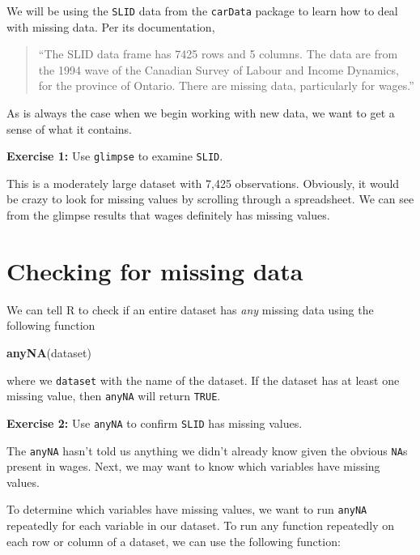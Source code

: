 \documentclass[
]{book}
\newenvironment{Shaded}{\begin{snugshade}}{\end{snugshade}}
\newcommand{\KeywordTok}[1]{\textcolor[rgb]{0.13,0.29,0.53}{\textbf{#1}}}
\newcommand{\NormalTok}[1]{#1}
\newenvironment{learncheck}%
{%
  \par\vspace{\baselineskip}\noindent 
  \color{Exercise}\begin{itshape}%
  \par\vspace{\baselineskip}\noindent\ignorespaces 
}%
{%
  \end{itshape}\ignorespacesafterend 
}
\begin{document}
We will be using the \texttt{SLID} data from the \texttt{carData} package to learn how to deal with missing data. Per its documentation,

\begin{quote}
``The SLID data frame has 7425 rows and 5 columns. The data are from the 1994 wave of the Canadian Survey of Labour and Income Dynamics, for the province of Ontario. There are missing data, particularly for wages.''
\end{quote}

As is always the case when we begin working with new data, we want to get a sense of what it contains.

\begin{learncheck}
\textbf{Exercise 1:} Use \texttt{glimpse} to examine \texttt{SLID}.
\end{learncheck}

This is a moderately large dataset with 7,425 observations. Obviously, it would be crazy to look for missing values by scrolling through a spreadsheet. We can see from the glimpse results that wages definitely has missing values.

\hypertarget{checking-for-missing-data}{%
\section{Checking for missing data}\label{checking-for-missing-data}}

We can tell R to check if an entire dataset has \emph{any} missing data using the following function

\begin{Shaded}
\begin{Highlighting}[]
\KeywordTok{anyNA}\NormalTok{(dataset)}
\end{Highlighting}
\end{Shaded}

where we \texttt{dataset} with the name of the dataset. If the dataset has at least one missing value, then \texttt{anyNA} will return \texttt{TRUE}.

\begin{learncheck}
\textbf{Exercise 2:} Use \texttt{anyNA} to confirm \texttt{SLID} has
missing values.
\end{learncheck}

The \texttt{anyNA} hasn't told us anything we didn't already know given the obvious \texttt{NA}s present in wages. Next, we may want to know which variables have missing values.

To determine which variables have missing values, we want to run \texttt{anyNA} repeatedly for each variable in our dataset. To run any function repeatedly on each row or column of a dataset, we can use the following function:
\end{document}
